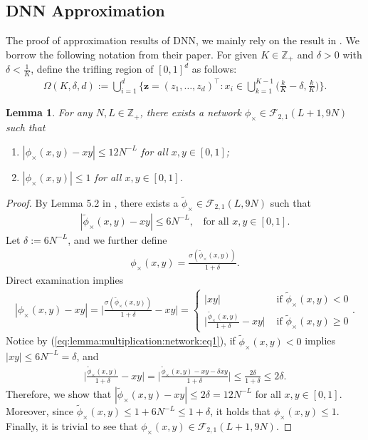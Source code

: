 \documentclass[11pt, preprint]{imsart}
\numberwithin{equation}{section}
\def \mcF{\mathcal{F}}
\def \bfz{\mathbf{z}}
\theoremstyle{plain}
\newtheorem{lemma}{\indent Lemma}
\theoremstyle{definition}
\begin{document}
\subsection{DNN Approximation}\label{sec:dnn:approximation}
The proof of approximation results of DNN, we mainly rely on the result in \cite{lsyz20}. We borrow the following notation from their paper. For given $K\in \mathbb{Z}_+$ and $\delta>0$ with $\delta<\frac{1}{K}$, define the  trifling region of $[0, 1]^d$ as follows:
\begin{eqnarray}
	\Omega(K, \delta, d):=\bigcup_{i=1}^d\bigg\{\bfz=(z_1,\ldots, z_d)^\top : x_i\in \bigcup_{k=1}^{K-1}\bigg(\frac{k}{K}-\delta, \frac{k}{K}\bigg)\bigg\}.
\end{eqnarray}
\begin{lemma}\label{lemma:multiplication:network}
For any $N, L\in \mathbb{Z}_+$, there exists a network $\phi_{\times}\in \mcF_{2,1}(L+1,9N)$ such that 
\begin{enumerate}
\item $|\phi_{\times}(x,y)-xy|\leq 12N^{-L}$ for all $x,y\in [0,1]$;
\item $|\phi_{\times}(x,y)|\leq 1$ for all $x,y\in [0,1]$.
\end{enumerate}
\end{lemma}
\begin{proof}
By Lemma 5.2 in \cite{lsyz20}, there exists a $\widetilde{\phi}_{\times} \in \mcF_{2,1}(L, 9N)$ such that
\begin{eqnarray}
		|\widetilde{\phi}_{\times}(x,y)-xy|\leq 6N^{-L}, \;\;\textrm{ for all } x,y\in [0,1].\label{eq:lemma:multiplication:network:eq1}
\end{eqnarray}
Let $\delta:=6N^{-L}$, and we further define
\begin{eqnarray}
	\phi_{\times}(x,y)=\frac{\sigma(\widetilde{\phi}_{\times}(x,y))}{1+\delta}.\nonumber
\end{eqnarray}
Direct examination implies
\begin{eqnarray}
	|\phi_{\times}(x,y)-xy|=\bigg|\frac{\sigma(\widetilde{\phi}_{\times}(x,y))}{1+\delta}-xy\bigg|=\begin{cases}
	|xy|&\textrm{ if } \widetilde{\phi}_{\times}(x,y)<0\\
	\bigg|\frac{\widetilde{\phi}_{\times}(x,y)}{1+\delta}-xy\bigg| &\textrm{ if } \widetilde{\phi}_{\times}(x,y)\geq 0
	\end{cases}.\nonumber
\end{eqnarray}
Notice by (\ref{eq:lemma:multiplication:network:eq1}), if $ \widetilde{\phi}_{\times}(x,y)<0$ implies $|xy|\leq 6N^{-L}=\delta$, and
\begin{eqnarray}
	\bigg|\frac{\widetilde{\phi}_{\times}(x,y)}{1+\delta}-xy\bigg|=\bigg|\frac{\widetilde{\phi}_{\times}(x,y)-xy-\delta xy}{1+\delta}\bigg|\leq \frac{2\delta}{1+\delta}\leq 2\delta.\nonumber
\end{eqnarray}
Therefore, we show that $|\widetilde{\phi}_{\times}(x,y)-xy|\leq 2\delta=12N^{-L}$ for all $x,y\in [0, 1]$. Moreover, since $\widetilde{\phi}_{\times}(x,y)\leq 1+6N^{-L}\leq 1+\delta$, it holds that $\phi_{\times}(x,y)\leq 1$. Finally, it is trivial to see that $\phi_{\times}(x,y) \in \mcF_{2,1}(L+1, 9N)$.
\end{proof}
\end{document}
